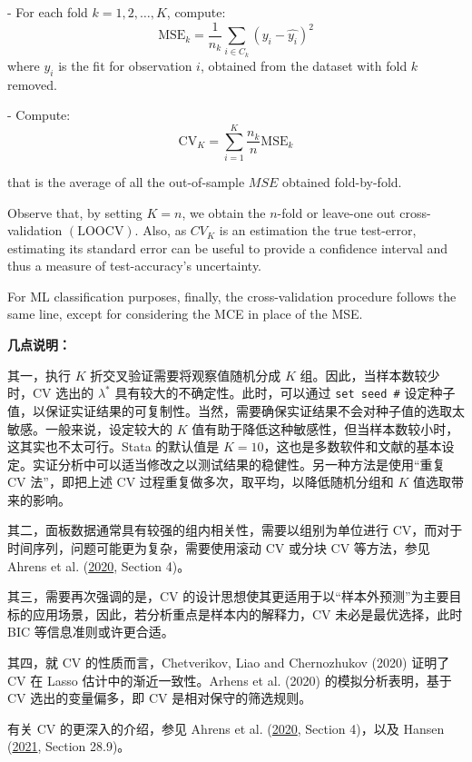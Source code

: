 - For each fold $k=1,2, \ldots, K$, compute:
$$
\mathrm{MSE}_{k}= 
\frac{1}{n_k}\sum_{i \in C_{k}}\left(y_{i}-\widehat{y_{i}}\right)^{2}
$$
where $\widehat{y_{i}}$ is the fit for observation $i$, obtained from the dataset with fold $k$ removed.

- Compute:
$$
\mathrm{CV}_{K}=\sum_{i=1}^{K} \frac{n_{k}}{n} \mathrm{MSE}_{k}
$$

that is the average of all the out-of-sample $M S E$ obtained fold-by-fold.

Observe that, by setting $K=n$, we obtain the $n$-fold or leave-one out cross-validation $(\mathrm{LOOCV}) .$ Also, as $C V_{K}$ is an estimation the true test-error, estimating its standard error can be useful to provide a confidence interval and thus a measure of test-accuracy's uncertainty.

For ML classification purposes, finally, the cross-validation procedure follows the same line, except for considering the MCE in place of the MSE.
\fi      %

\vspace{10pt}
\textbf{几点说明：}

其一，执行 $K$ 折交叉验证需要将观察值随机分成 $K$ 组。因此，当样本数较少时，CV 选出的 $\lambda^*$ 具有较大的不确定性。此时，可以通过 \texttt{set seed \#} 设定种子值，以保证实证结果的可复制性。当然，需要确保实证结果不会对种子值的选取太敏感。一般来说，设定较大的 $K$ 值有助于降低这种敏感性，但当样本数较小时，这其实也不太可行。Stata 的默认值是 $K=10$，这也是多数软件和文献的基本设定。实证分析中可以适当修改之以测试结果的稳健性。另一种方法是使用“重复 CV 法”，即把上述 CV 过程重复做多次，取平均，以降低随机分组和 $K$ 值选取带来的影响。


其二，面板数据通常具有较强的组内相关性，需要以组别为单位进行 CV，而对于时间序列，问题可能更为复杂，需要使用滚动 CV 或分块 CV 等方法，参见 Ahrens et al. (\href{http://sci-hub.ren/10.1177/1536867X20909697}{2020}, Section 4)。 

其三，需要再次强调的是，CV 的设计思想使其更适用于以“样本外预测”为主要目标的应用场景，因此，若分析重点是样本内的解释力，CV 未必是最优选择，此时 BIC 等信息准则或许更合适。

其四，就 CV 的性质而言，Chetverikov, Liao and Chernozhukov (2020) 证明了 CV 在 Lasso 估计中的渐近一致性。Arhens et al. (2020) 的模拟分析表明，基于 CV 选出的变量偏多，即 CV 是相对保守的筛选规则。 

有关 CV 的更深入的介绍，参见 Ahrens et al. (\href{http://sci-hub.ren/10.1177/1536867X20909697}{2020}, Section 4)，以及 Hansen (\href{https://www.ssc.wisc.edu/~bhansen/econometrics/Econometrics.pdf}{2021}, Section 28.9)。

